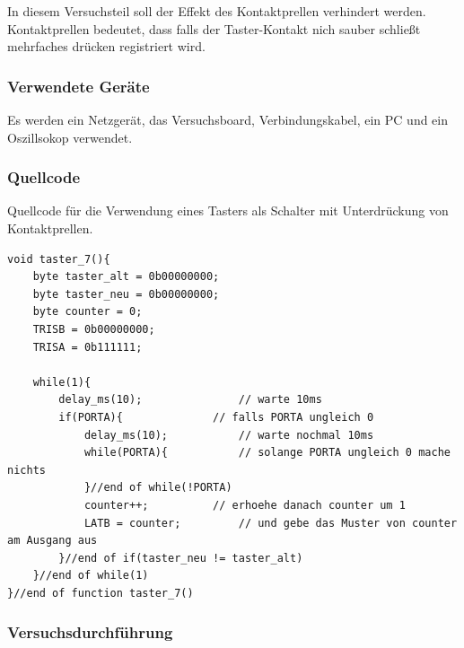 \documentclass[12pt,a4paper]{article}
\begin{document}
In diesem Versuchsteil soll der Effekt des Kontaktprellen verhindert werden. Kontaktprellen bedeutet, dass falls der Taster-Kontakt nich sauber schließt mehrfaches drücken registriert wird.

\subsubsection*{Verwendete Geräte}

Es werden ein Netzgerät, das Versuchsboard, Verbindungskabel, ein PC und ein Oszillsokop verwendet.

\subsubsection*{Quellcode}

Quellcode für die Verwendung eines Tasters als Schalter mit Unterdrückung von Kontaktprellen.

\lstset{language=C, basicstyle=\tiny}
\begin{lstlisting}[caption = {Verhindern von Kontakprellen}, label=lst:g_10,captionpos=b]
void taster_7(){
	byte taster_alt = 0b00000000;
	byte taster_neu = 0b00000000;
	byte counter = 0;
	TRISB = 0b00000000;
	TRISA = 0b111111;
	
	while(1){
		delay_ms(10);				// warte 10ms
		if(PORTA){				// falls PORTA ungleich 0
			delay_ms(10);			// warte nochmal 10ms
			while(PORTA){			// solange PORTA ungleich 0 mache nichts
			}//end of while(!PORTA)
			counter++;			// erhoehe danach counter um 1 
			LATB = counter;			// und gebe das Muster von counter am Ausgang aus
		}//end of if(taster_neu != taster_alt)
	}//end of while(1)
}//end of function taster_7()
\end{lstlisting}

\subsubsection*{Versuchsdurchführung}
\end{document}
